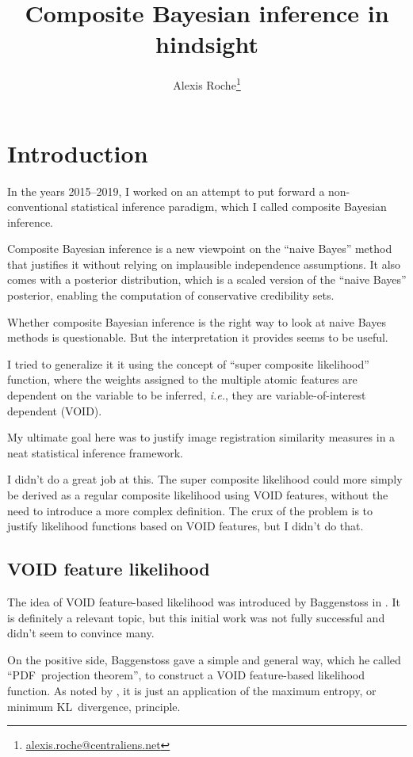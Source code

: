 \documentclass[english]{scrartcl}
\title{Composite Bayesian inference in hindsight}
\author{Alexis Roche\thanks{\url{alexis.roche@centraliens.net}}}
\begin{document}
\maketitle

\section{Introduction}

In the years 2015--2019, I worked on an attempt to put forward a non-conventional statistical inference paradigm, which I called composite Bayesian inference.

Composite Bayesian inference is a new viewpoint on the ``naive Bayes'' method that justifies it without relying on implausible independence assumptions. It also comes with a posterior distribution, which is a scaled version of the ``naive Bayes'' posterior, enabling the computation of conservative credibility sets.

Whether composite Bayesian inference is the right way to look at naive Bayes methods is questionable. But the interpretation it provides seems to be useful.

I tried to generalize it it using the concept of ``super composite likelihood'' function, where the weights assigned to the multiple atomic features are dependent on the variable to be inferred, {\em i.e.}, they are variable-of-interest dependent (VOID).

My ultimate goal here was to justify image registration similarity measures in a neat statistical inference framework.

I didn't do a great job at this. The super composite likelihood could more simply be derived as a regular composite likelihood using VOID features, without the need to introduce a more complex definition. The crux of the problem is to justify likelihood functions based on VOID features, but I didn't do that.

\subsection{VOID feature likelihood}

The idea of VOID feature-based likelihood was introduced by Baggenstoss in \cite{Baggenstoss-03}. It is definitely a relevant topic, but this initial work was not fully successful and didn't seem to convince many.

On the positive side, Baggenstoss gave a simple and general way, which he called ``PDF~projection theorem'', to construct a VOID feature-based likelihood function. As noted by \cite{Minka-04}, it is just an application of the maximum entropy, or minimum KL~divergence, principle.
\end{document}
